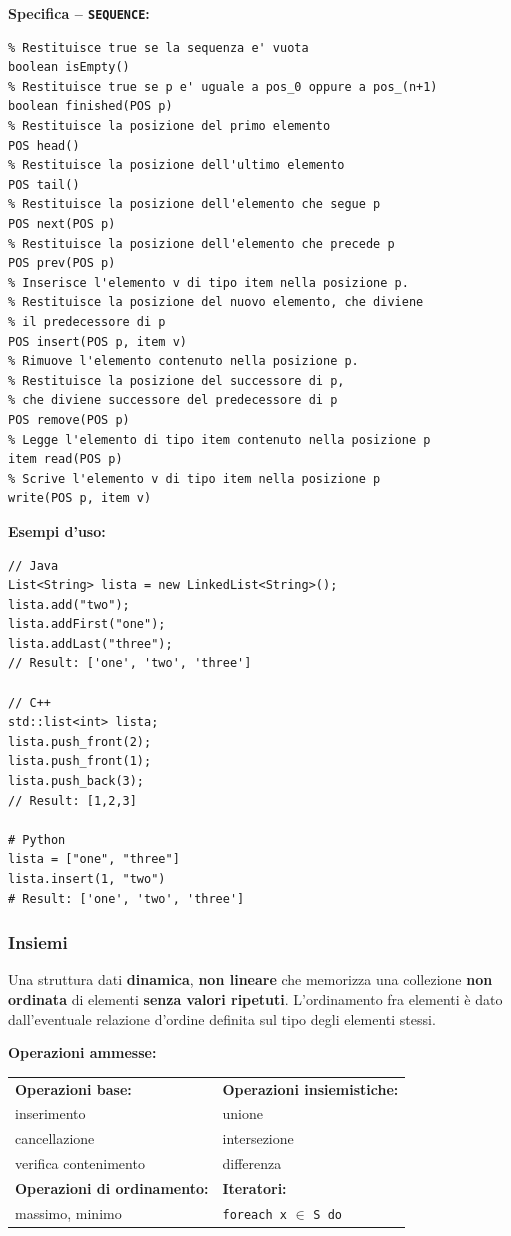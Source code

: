 \documentclass[12pt, a4paper]{article}
\begin{document}
\textbf{Specifica -- \texttt{SEQUENCE}:}
\begin{verbatim}
% Restituisce true se la sequenza e' vuota
boolean isEmpty()
% Restituisce true se p e' uguale a pos_0 oppure a pos_(n+1)
boolean finished(POS p)
% Restituisce la posizione del primo elemento
POS head()
% Restituisce la posizione dell'ultimo elemento
POS tail()
% Restituisce la posizione dell'elemento che segue p
POS next(POS p)
% Restituisce la posizione dell'elemento che precede p
POS prev(POS p)
% Inserisce l'elemento v di tipo item nella posizione p.
% Restituisce la posizione del nuovo elemento, che diviene
% il predecessore di p
POS insert(POS p, item v)
% Rimuove l'elemento contenuto nella posizione p.
% Restituisce la posizione del successore di p,
% che diviene successore del predecessore di p
POS remove(POS p)
% Legge l'elemento di tipo item contenuto nella posizione p
item read(POS p)
% Scrive l'elemento v di tipo item nella posizione p
write(POS p, item v)
\end{verbatim}

\textbf{Esempi d'uso:}
\begin{verbatim}
// Java
List<String> lista = new LinkedList<String>();
lista.add("two");
lista.addFirst("one");
lista.addLast("three");
// Result: ['one', 'two', 'three']

// C++
std::list<int> lista;
lista.push_front(2);
lista.push_front(1);
lista.push_back(3);
// Result: [1,2,3]

# Python
lista = ["one", "three"]
lista.insert(1, "two")
# Result: ['one', 'two', 'three']
\end{verbatim}

\subsubsection{Insiemi}

\begin{tcolorbox}[colback=lightergray!10, colframe=tocsec, title=\textbf{Definizione: Insieme}]
\label{def:insieme}
Una struttura dati \textbf{dinamica}, \textbf{non lineare} che memorizza una collezione \textbf{non ordinata} di elementi \textbf{senza valori ripetuti}. L'ordinamento fra elementi è dato dall'eventuale relazione d'ordine definita sul tipo degli elementi stessi.
\end{tcolorbox}

\textbf{Operazioni ammesse:}
\begin{center}
\begin{tabular}{ll}
\textbf{Operazioni base:} & \textbf{Operazioni insiemistiche:} \\
inserimento & unione \\
cancellazione & intersezione \\
verifica contenimento & differenza \\
\textbf{Operazioni di ordinamento:} & \textbf{Iteratori:} \\
massimo, minimo & \texttt{foreach x} $\in$ \texttt{S do} \\
\end{tabular}
\end{center}
\end{document}
